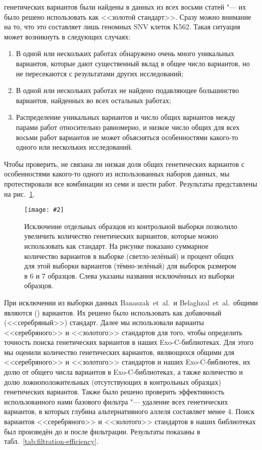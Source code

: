 \documentclass[12pt, twoside, a4paper]{article}
\newcommand{\picref}[1]{рис.~\ref{#1}}
\newcommand{\tableref}[1]{табл.~\ref{#1}}
\newcommand{\centerfigure}[5]
{\begin{figure}[#1]\centering\texttt{[image: \#2]}\caption{\label{#3}#4}\end{figure}}
\begin{document}
 генетических вариантов были найдены в данных из всех восьми статей "--- их было решено использовать как <<золотой стандарт>>.
Сразу можно внимание на то, что это составляет лишь  геномных SNV клеток K562.
Такая ситуация может возникнуть в следующих случаях:

\begin{enumerate}
	\item В одной или нескольких работах обнаружено очень много уникальных вариантов, которые дают существенный вклад в общее число вариантов, но не пересекаются с результатами других исследований;
	\item В одной или нескольких работах не найдено подавляющее большинство вариантов, найденных во всех остальных работах;
	\item Распределение уникальных вариантов и число общих вариантов между парами работ относительно равномерно, и низкое число общих для всех восьми работ вариантов не может объясняться особенностями какого-то одного или нескольких исследований.
\end{enumerate}

Чтобы проверить, не связана ли низкая доля общих генетических вариантов с особенностями какого-то одного из использованных наборов данных, мы протестировали все комбинации из семи и шести работ.
Результаты представлены на \picref{fig:exclusion}.

\centerfigure{hp!}{Exclusion_6.pdf}{fig:exclusion}{Исключение отдельных образцов из контрольной выборки позволило увеличить количество генетических вариантов, которые можно использовать как стандарт. На рисунке показано суммарное количество вариантов в выборке (светло-зелёный) и процент общих для этой выборки вариантов (тёмно-зелёный) для выборок размером в 6 и 7 образцов. Слева указаны названия исключённых из выборки образцов.}{0.7}

При исключении из выборки данных Banaszak~et~al.\,\cite{Banaszak_2018} и Belaghzal~et~al.\,\cite{Belaghzal_2017} общими являются  () вариантов.
Их решено было использовать как добавочный (<<серебряный>>) стандарт.
Далее мы использовали варианты <<серебряного>> и <<золотого>> стандартов для того, чтобы определить точность поиска генетических вариантов в наших Exo-C\hyp{}библиотеках.
Для этого мы оценили количество генетических вариантов, являющихся общими для <<серебряного>> и <<золотого>> стандартов и наших Exo-C\hyp{}библиотек, их долю от общего числа вариантов в Exo-C\hyp{}библиотеках, а также количество и долю ложноположительных (отсутствующих в контрольных образцах) генетических вариантов.
Также было решено проверить эффективность использованного нами базового фильтра "--- удаление всех генетических вариантов, в которых глубина альтернативного аллеля составляет менее 4.
Поиск вариантов <<серебряного>> и <<золотого>> стандартов в наших библиотеках был произведён до и после фильтрации.
Результаты показаны в \tableref{tab:filtration-efficiency}.
\end{document}

